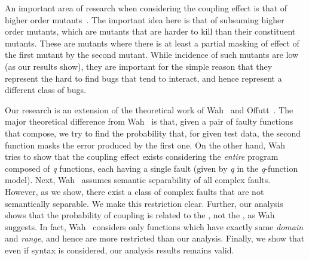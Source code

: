 \documentclass[preprint,nonatbib]{sigplanconf}\usepackage[]{graphicx}\usepackage[]{color}
\begin{document}
An important area of research when considering the coupling effect is that of
higher order mutants~\cite{jia2008constructing,jia2009higher,nguyen2014problems}. The important
idea here is that of subsuming higher order mutants, which are mutants that are
harder to kill than their constituent mutants. These are mutants where there is
at least a partial masking of effect of the first mutant by the second mutant.
While incidence of such mutants are low (as our results show), they are
important for the simple reason that they represent the hard to find bugs that
tend to interact, and hence represent a different class of bugs.

Our research is an extension of the theoretical work of Wah~\cite{wah2000atheoretical}
and Offutt~\cite{offutt1989thecoupling,offutt1992investigations}. The
major theoretical difference from Wah~\cite{wah2000atheoretical} is that, given
a pair of faulty functions that compose, we try to find the probability that,
for given test data, the second function masks the error
produced by the first one.  On the other hand, Wah~\cite{wah2000atheoretical}
tries to show that the coupling effect exists considering the \emph{entire}
program composed of \emph{q} functions, each having a single fault (given by
\emph{q} in the \emph{q}-function model).
Next, Wah~\cite{wah2000atheoretical} assumes semantic separability of all
complex faults. However, as we show, there exist a class of complex faults that
are not semantically separable. We make this restriction clear.
Further, our
analysis shows that the probability of coupling is related to the \foutput,
not the \finput, as Wah~\cite{wah2000atheoretical} suggests. In fact,
Wah~\cite{wah2000atheoretical} considers only functions which have exactly same
\emph{domain} and \emph{range}, and hence are more restricted than our analysis.
Finally, we show that even if syntax is considered, our analysis results remains
valid.
\end{document}
